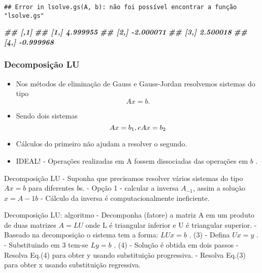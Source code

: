 \documentclass[
]{article}
\newenvironment{Shaded}{\begin{snugshade}}{\end{snugshade}}
\newcommand{\DocumentationTok}[1]{\textcolor[rgb]{0.56,0.35,0.01}{\textbf{\textit{#1}}}}
\newcommand{\FunctionTok}[1]{\textcolor[rgb]{0.13,0.29,0.53}{\textbf{#1}}}
\newcommand{\NormalTok}[1]{#1}
\newcommand{\SpecialCharTok}[1]{\textcolor[rgb]{0.81,0.36,0.00}{\textbf{#1}}}
\providecommand{\tightlist}{%
  \setlength{\itemsep}{0pt}\setlength{\parskip}{0pt}}
\begin{document}
\begin{Shaded}
\end{Shaded}

\begin{verbatim}
## Error in lsolve.gs(A, b): não foi possível encontrar a função "lsolve.gs"
\end{verbatim}

\begin{Shaded}
\begin{Highlighting}[]
\DocumentationTok{\#\# [,1]}
\DocumentationTok{\#\# [1,] 4.999955}
\DocumentationTok{\#\# [2,] {-}2.000071}
\DocumentationTok{\#\# [3,] 2.500018}
\DocumentationTok{\#\# [4,] {-}0.999968}
\end{Highlighting}
\end{Shaded}

\hypertarget{decomposiuxe7uxe3o-lu}{%
\subsubsection{Decomposição LU}\label{decomposiuxe7uxe3o-lu}}

\begin{itemize}
\tightlist
\item
  Nos métodos de eliminação de Gauss e Gauss-Jordan resolvemos sistemas
  do tipo \[ Ax  = b .\]
\item
  Sendo dois sistemas \[Ax  = b_1, e \space Ax  = b_2\]
\item
  Cálculos do primeiro não ajudam a resolver o segundo.
\item
  IDEAL! - Operações realizadas em A fossem dissociadas das operações em
  \(b\) .
\end{itemize}

Decomposição LU - Suponha que precisamos resolver vários sistemas do
tipo \(Ax = b\) para diferentes \(b\)s. - Opção 1 - calcular a inversa
\(A_{-1}\), assim a solução \(x = A-1b\) - Cálculo da inversa é
computacionalmente ineficiente.

Decomposição LU: algoritmo - Decomponha (fatore) a matriz A em um
produto de duas matrizes \(A = LU\) onde L é triangular inferior e U é
triangular superior. - Baseado na decomposição o sistema tem a forma:
\(LUx = b\) . (3) - Defina \(Ux = y\) . - Substituindo em 3 tem-se
\(Ly = b\) . (4) - Solução é obtida em dois passos - Resolva Eq.(4) para
obter y usando substituição progressiva. - Resolva Eq.(3) para obter x
usando substituição regressiva.
\end{document}
